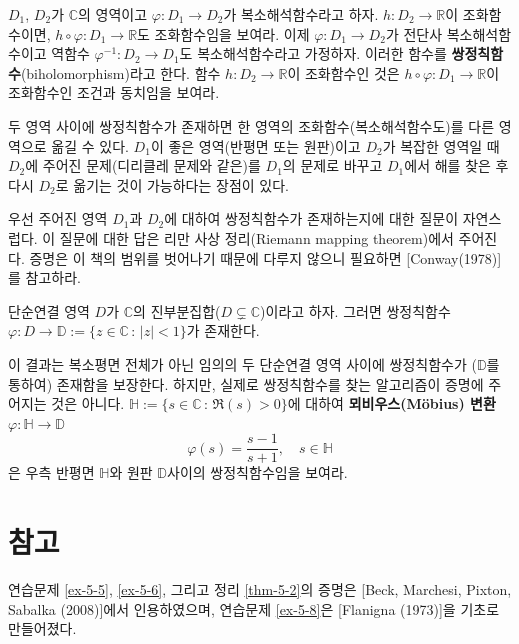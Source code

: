 \begin{salt_exercise}\label{ex-5-11}
$D_1$, $D_2$가 $\mathbb C$의 영역이고
$\varphi: D_1 \to D_2$가 복소해석함수라고 하자.
$h:D_2\to \mathbb R$이 조화함수이면,
$h\circ \varphi : D_1 \to \mathbb R$도 조화함수임을 보여라.
이제 $\varphi: D_1 \to D_2$가 전단사 복소해석함수이고
역함수 $\varphi^{-1}: D_2 \to D_1$도 복소해석함수라고 가정하자.
이러한 함수를 {\bf 쌍정칙함수}(biholomorphism)라고 한다.
함수 $h:D_2\to \mathbb R$이 조화함수인 것은
$h\circ \varphi : D_1 \to \mathbb R$이 조화함수인 조건과 동치임을 보여라.

두 영역 사이에 쌍정칙함수가 존재하면
한 영역의 조화함수(복소해석함수도)를 다른 영역으로 옮길 수 있다.
$D_1$이 좋은 영역(반평면 또는 원판)이고 $D_2$가 복잡한 영역일 때
$D_2$에 주어진 문제(디리클레 문제와 같은)를 $D_1$의 문제로 바꾸고
$D_1$에서 해를 찾은 후 다시 $D_2$로 옮기는 것이 가능하다는 장점이 있다.

우선 주어진 영역 $D_1$과 $D_2$에 대하여
쌍정칙함수가 존재하는지에 대한 질문이 자연스럽다.
이 질문에 대한 답은 리만 사상 정리(Riemann mapping theorem)에서 주어진다.
증명은 이 책의 범위를 벗어나기 때문에 다루지 않으니
필요하면 [Conway(1978)]를 참고하라.


\begin{salttheorem}[리만 사상 정리]{}{} \label{thm-5-5}
 단순연결 영역 $D$가 $\mathbb C$의 진부분집합($D\subsetneq \mathbb C$)이라고 하자.
 그러면 쌍정칙함수 $\varphi: D\to \mathbb D:=\{z\in\mathbb C\,:\, |z|<1\}$가
 존재한다.
\end{salttheorem}

이 결과는 복소평면 전체가 아닌 임의의 두 단순연결 영역 사이에
쌍정칙함수가 ($\mathbb D$를 통하여) 존재함을 보장한다. 
하지만, 실제로 쌍정칙함수를 찾는 알고리즘이 증명에 주어지는 것은 아니다.
$\mathbb H:= \{s\in\mathbb C\,:\, \Re(s) >0 \}$에 대하여
{\bf 뫼비우스(M\"obius) 변환} $\varphi: \mathbb H \to \mathbb D$
\[ 
\varphi(s) = \dfrac{s-1}{s+1},
\quad s\in \mathbb H
\]
은 우측 반평면 $\mathbb H$와 원판  $\mathbb D$사이의 쌍정칙함수임을 보여라.
\end{salt_exercise}

\section{참고}

연습문제 \ref{ex-5-5}, \ref{ex-5-6}, 그리고 정리 \ref{thm-5-2}의 증명은
[Beck, Marchesi, Pixton, Sabalka (2008)]에서 인용하였으며,
연습문제 \ref{ex-5-8}은 [Flanigna (1973)]을 기초로 만들어졌다.

